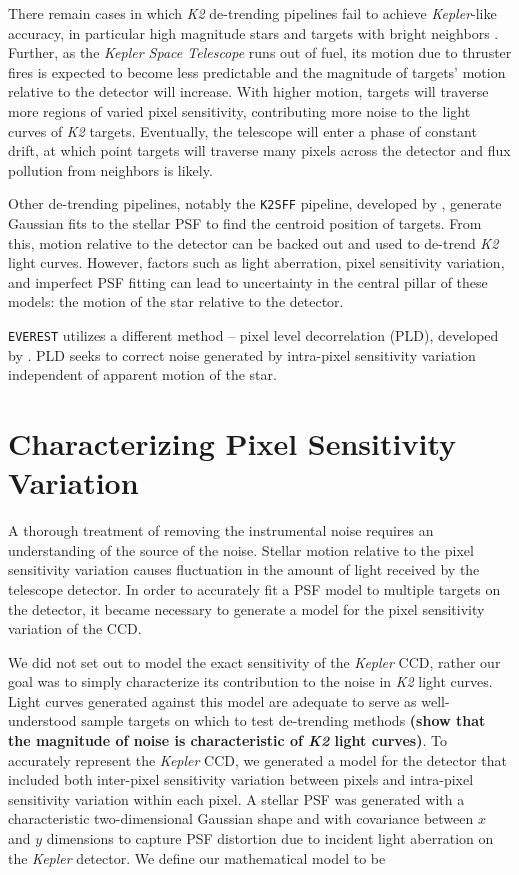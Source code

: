 \documentclass[12pt,preprint]{aastex}
\begin{document}
There remain cases in which \textit{K2} de-trending pipelines fail to achieve \textit{Kepler}-like accuracy, in particular high magnitude stars and targets with bright neighbors \citep{2017arXiv170205488L}. Further, as the \textit{Kepler Space Telescope} runs out of fuel, its motion due to thruster fires is expected to become less predictable and the magnitude of targets' motion relative to the detector will increase. With higher motion, targets will traverse more regions of varied pixel sensitivity, contributing more noise to the light curves of \textit{K2} targets. Eventually, the telescope will enter a phase of constant drift, at which point targets will traverse many pixels across the detector and flux pollution from neighbors is likely. 

Other de-trending pipelines, notably the \texttt{K2SFF} pipeline, developed by \cite{2014PASP..126..948V}, generate Gaussian fits to the stellar PSF to find the centroid position of targets. From this, motion relative to the detector can be backed out and used to de-trend \textit{K2} light curves. However, factors such as light aberration, pixel sensitivity variation, and imperfect PSF fitting can lead to uncertainty in the central pillar of these models: the motion of the star relative to the detector.

\texttt{EVEREST} utilizes a different method -- pixel level decorrelation (PLD), developed by \cite{0004-637X-805-2-132}. PLD seeks to correct noise generated by intra-pixel sensitivity variation independent of apparent motion of the star.

\section{Characterizing Pixel Sensitivity Variation}

A thorough treatment of removing the instrumental noise requires an understanding of the source of the noise. Stellar motion relative to the pixel sensitivity variation causes fluctuation in the amount of light received by the telescope detector. In order to accurately fit a PSF model to multiple targets on the detector, it became necessary to generate a model for the pixel sensitivity variation of the CCD.

We did not set out to model the exact sensitivity of the \textit{Kepler} CCD, rather our goal was to simply characterize its contribution to the noise in \textit{K2} light curves. Light curves generated against this model are adequate to serve as well-understood sample targets on which to test de-trending methods \textbf{(show that the magnitude of noise is characteristic of \textit{K2} light curves)}. To accurately represent the \textit{Kepler} CCD, we generated a model for the detector that included both inter-pixel sensitivity variation between pixels and intra-pixel sensitivity variation within each pixel. A stellar PSF was generated with a characteristic two-dimensional Gaussian shape and with covariance between $x$ and $y$ dimensions to capture PSF distortion due to incident light aberration on the \textit{Kepler} detector. We define our mathematical model to be
\end{document}
